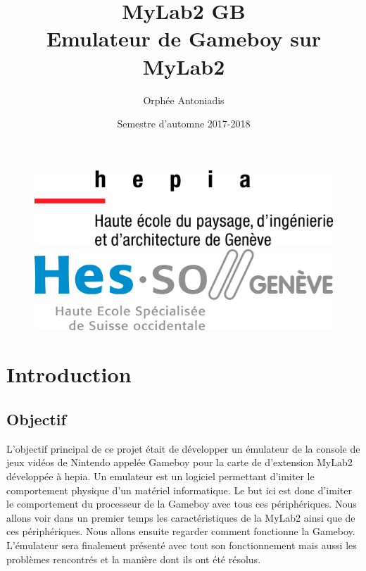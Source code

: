 \documentclass[a4paper]{article}
\title{MyLab2 GB \protect\\ Emulateur de Gameboy sur MyLab2}
\author{Orphée Antoniadis}
\affil{\small Projet de semestre - Prof. Fabien Vannel}
\affil{\small Hepia ITI 3\up{ème} année}
\date{Semestre d'automne 2017-2018}
\begin{document}
\maketitle

\begin{figure}[!b]
	\centering
	\begin{minipage}{.5\textwidth}
		\centering
		\includegraphics[width=.6\linewidth]{images/hepia.jpg}
	\end{minipage}%
	\begin{minipage}{.5\textwidth}
		\centering
		\includegraphics[width=.6\linewidth]{images/hesso.jpg}
	\end{minipage}
\end{figure}
\newpage

\newpage
\setcounter{tocdepth}{3}
\tableofcontents
\newpage


\section{Introduction}
\subsection{Objectif}
L'objectif principal de ce projet était de développer un émulateur de la console
de jeux vidéos de Nintendo appelée Gameboy pour la carte de d'extension MyLab2
développée à hepia. Un emulateur est un logiciel permettant d'imiter le comportement
physique d'un matériel informatique. Le but ici est donc d'imiter le comportement
du processeur de la Gameboy avec tous ces périphériques. Nous allons voir dans
un premier temps les caractéristiques de la MyLab2 ainsi que de ces périphériques.
Nous allons ensuite regarder comment fonctionne la Gameboy. L'émulateur sera
finalement présenté avec tout son fonctionnement mais aussi les problèmes rencontrés
et la manière dont ils ont été résolus.
\end{document}
